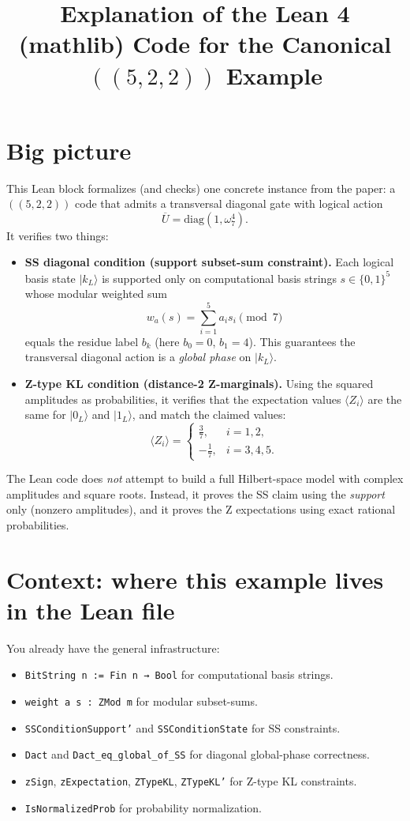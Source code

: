 \documentclass[11pt]{article}
\title{Explanation of the Lean 4 (mathlib) Code for the Canonical $((5,2,2))$ Example}
\author{}
\date{}
\newcommand{\ket}[1]{\lvert #1 \rangle}
\begin{document}
\maketitle

\section*{Big picture}

This Lean block formalizes (and checks) one concrete instance from the paper: a $((5,2,2))$ code that admits a transversal diagonal gate with logical action
\[
\overline U=\mathrm{diag}(1,\omega_7^4).
\]
It verifies two things:

\begin{itemize}
\item \textbf{SS diagonal condition (support subset-sum constraint).}
Each logical basis state \(\ket{k_L}\) is supported only on computational basis strings \(s\in\{0,1\}^5\) whose modular weighted sum
\[
w_a(s)=\sum_{i=1}^5 a_i s_i \pmod 7
\]
equals the residue label \(b_k\) (here \(b_0=0\), \(b_1=4\)). This guarantees the transversal diagonal action is a \emph{global phase} on \(\ket{k_L}\).

\item \textbf{Z-type KL condition (distance-2 Z-marginals).}
Using the squared amplitudes as probabilities, it verifies that the expectation values \(\langle Z_i\rangle\) are the same for \(\ket{0_L}\) and \(\ket{1_L}\), and match the claimed values:
\[
\langle Z_i\rangle=
\begin{cases}
\frac{3}{7}, & i=1,2,\\[4pt]
-\frac{1}{7}, & i=3,4,5.
\end{cases}
\]
\end{itemize}

The Lean code does \emph{not} attempt to build a full Hilbert-space model with complex amplitudes and square roots. Instead, it proves the SS claim using the \emph{support} only (nonzero amplitudes), and it proves the Z expectations using exact rational probabilities.

\section*{Context: where this example lives in the Lean file}

You already have the general infrastructure:

\begin{itemize}
\item \texttt{BitString n := Fin n → Bool} for computational basis strings.
\item \texttt{weight a s : ZMod m} for modular subset-sums.
\item \texttt{SSConditionSupport'} and \texttt{SSConditionState} for SS constraints.
\item \texttt{Dact} and \texttt{Dact\_eq\_global\_of\_SS} for diagonal global-phase correctness.
\item \texttt{zSign}, \texttt{zExpectation}, \texttt{ZTypeKL}, \texttt{ZTypeKL'} for Z-type KL constraints.
\item \texttt{IsNormalizedProb} for probability normalization.
\end{itemize}
\end{document}
